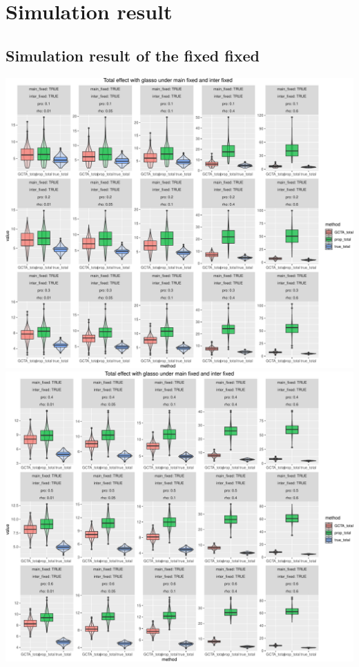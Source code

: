 \documentclass[]{article}
\begin{document}
\section{Simulation result}\label{simulation-result}

\subsection{Simulation result of the fixed
fixed}\label{simulation-result-of-the-fixed-fixed}

\includegraphics{Simulation_report_glasso_files/figure-latex/fixed fixed total glasso-1.pdf}
\includegraphics{Simulation_report_glasso_files/figure-latex/fixed fixed total glasso-2.pdf}
\end{document}
